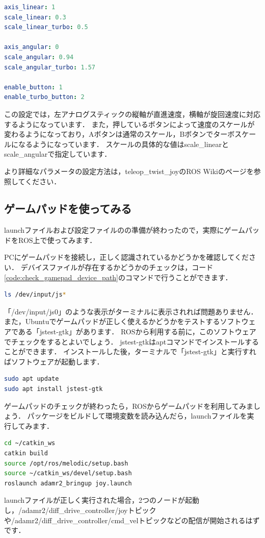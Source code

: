 \documentclass[{../../master}]{subfiles}
\begin{document}
\begin{lstlisting}[language=yaml, label=code:f310_config_yml, caption=\textsf{f310.config.yml}]
axis_linear: 1
scale_linear: 0.3
scale_linear_turbo: 0.5

axis_angular: 0
scale_angular: 0.94
scale_angular_turbo: 1.57

enable_button: 1
enable_turbo_button: 2
\end{lstlisting}

この設定では，左アナログスティックの縦軸が直進速度，横軸が旋回速度に対応するようになっています．
また，押しているボタンによって速度のスケールが変わるようになっており，Aボタンは通常のスケール，Bボタンでターボスケールになるようになっています．
スケールの具体的な値は\textsf{scale\_linear}と\textsf{scale\_angular}で指定しています．

より詳細なパラメータの設定方法は，\textsf{teleop\_twist\_joy}のROS Wikiのページを参照してください．

\subsection{ゲームパッドを使ってみる}

launchファイルおよび設定ファイルのの準備が終わったので，実際にゲームパッドをROS上で使ってみます．

PCにゲームパッドを接続し，正しく認識されているかどうかを確認してください．
デバイスファイルが存在するかどうかのチェックは，コード\ref{code:check_gamepad_device_path}のコマンドで行うことができます．

\begin{lstlisting}[language=sh, label=code:check_gamepad_device_path, caption=Check Device File of Gamepad]
ls /dev/input/js*
\end{lstlisting}

「\textsf{/dev/input/js0}」のような表示がターミナルに表示されれば問題ありません．
また，Ubuntuでゲームパッドが正しく使えるかどうかをテストするソフトウェアである「\textsf{jstest-gtk}」があります．
ROSから利用する前に，このソフトウェアでチェックをするとよいでしょう．
\textsf{jstest-gtk}は\textsf{apt}コマンドでインストールすることができます．
インストールした後，ターミナルで「\textsf{jstest-gtk}」と実行すればソフトウェアが起動します．

\begin{lstlisting}[language=sh, caption=Install \textsf{jstest-gtk}]
sudo apt update
sudo apt install jstest-gtk
\end{lstlisting}

ゲームパッドのチェックが終わったら，ROSからゲームパッドを利用してみましょう．
パッケージをビルドして環境変数を読み込んだら，launchファイルを実行してみます．

\begin{lstlisting}[language=sh, caption=launch \textsf{joy.launch}]
cd ~/catkin_ws
catkin build
source /opt/ros/melodic/setup.bash
source ~/catkin_ws/devel/setup.bash
roslaunch adamr2_bringup joy.launch
\end{lstlisting}

launchファイルが正しく実行された場合，2つのノードが起動し，\textsf{/adamr2/diff\_drive\_controller/joy}トピックや\textsf{/adamr2/diff\_drive\_controller/cmd\_vel}トピックなどの配信が開始されるはずです．
\end{document}
